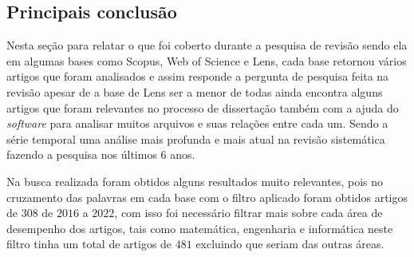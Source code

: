 \subsection{Principais conclus\~ao} \label{subsec:conclusão da revisão}

Nesta seção para relatar o que foi coberto durante a pesquisa de revisão sendo ela em algumas bases como Scopus, Web of Science e Lens, cada base retornou vários artigos que foram analisados e assim responde a pergunta de pesquisa feita na revisão apesar de a base de Lens ser a menor de todas ainda encontra alguns artigos que foram relevantes no processo de dissertação também com a ajuda do \textit{software} para analisar muitos arquivos e suas relações entre cada um. Sendo a série temporal uma análise mais profunda e mais atual na revisão sistemática fazendo a pesquisa nos últimos 6 anos.

Na busca realizada foram obtidos alguns resultados muito relevantes, pois no cruzamento das palavras em cada base com o filtro aplicado foram obtidos artigos de $308$ de $2016$ a $2022$, com isso foi necessário filtrar mais sobre cada área de desempenho dos artigos, tais como matemática, engenharia e informática neste filtro tinha um total de artigos de $481$ excluindo que seriam das outras áreas.

